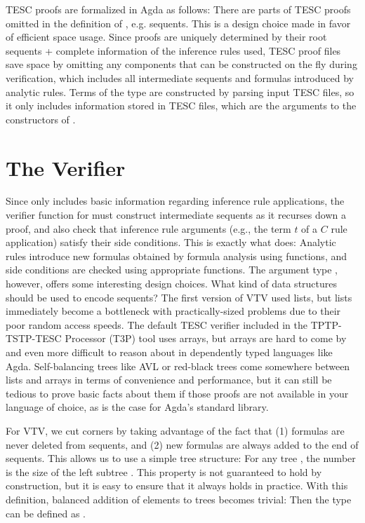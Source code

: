 \documentclass[12pt]{article}
\begin{document}
TESC proofs are formalized in Agda as follows:
There are parts of TESC proofs omitted in the definition of 
, e.g. sequents. This is a design choice made in favor of
efficient space usage. Since proofs are uniquely determined by their
root sequents + complete information of the inference rules used,
TESC proof files save space by omitting any components that can be 
constructed on the fly during verification, which includes all intermediate 
sequents and formulas introduced by analytic rules. Terms of the type 
 are constructed by parsing input TESC files, 
so it only includes information stored in TESC files, which are the arguments 
to the constructors of .



\section{The Verifier} \label{sec:verifier} 

Since  only includes basic information regarding inference 
rule applications, the verifier function for  must construct 
intermediate sequents as it recurses down a proof, and also check that inference 
rule arguments (e.g., the term $t$ of a $C$ rule application) satisfy their side 
conditions. This is exactly what  does:
Analytic rules introduce new formulas obtained by formula analysis using 
 functions, and side conditions are checked using appropriate 
 functions. The argument type , however, 
offers some interesting design choices. What kind of data structures should be used 
to encode sequents? The first version of VTV used lists, but lists immediately become 
a bottleneck with practically-sized problems due to their poor random access speeds. 
The default TESC verifier included in the TPTP-TSTP-TESC Processor (T3P) tool uses arrays, 
but arrays are hard to come by and even more difficult to reason about in dependently 
typed languages like Agda. Self-balancing trees like AVL or red-black trees come 
somewhere between lists and arrays in terms of convenience and performance, but it 
can still be tedious to prove basic facts about them if those proofs are not 
available in your language of choice, as is the case for Agda's standard library.

For VTV, we cut corners by taking advantage of the fact that (1) formulas 
are never deleted from sequents, and (2) new formulas are always added to the 
end of sequents. This allows us to use a simple tree structure:
For any tree     ,
the number  is the size of the left subtree . 
This property is not guaranteed to hold by construction,
but it is easy to ensure that it always holds in practice. With this definition,
balanced addition of elements to trees becomes trivial:
Then the type  can be defined as .
\end{document}
